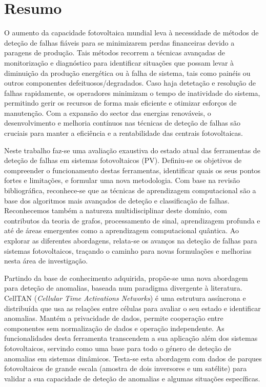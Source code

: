 \chapter*{Resumo}

O aumento da capacidade fotovoltaica mundial leva à necessidade de métodos de deteção de falhas fiáveis para se minimizarem perdas financeiras devido a paragens de produção. Tais métodos recorrem a técnicas avançadas de monitorização e diagnóstico para identificar situações que possam levar à diminuição da produção energética ou à falha de sistema, tais como painéis ou outros componentes defeituosos/degradados. Caso haja detetação e resolução de falhas rapidamente, os operadores minimizam o tempo de inatividade do sistema, permitindo gerir os recursos de forma mais eficiente e otimizar esforços de manutenção. Com a expansão do sector das energias renováveis, o desenvolvimento e melhoria contínuos nas técnicas de deteção de falhas são cruciais para manter a eficiência e a rentabilidade das centrais fotovoltaicas.

Neste trabalho faz-se uma avaliação exaustiva do estado atual das ferramentas de deteção de falhas em sistemas fotovoltaicos (PV). Definiu-se os objetivos de compreender o funcionamento destas ferramentas, identificar quais os seus pontos fortes e limitações, e formular uma nova metodologia. Com base na revisão bibliográfica, reconhece-se que as técnicas de aprendizagem computacional são a base dos algoritmos mais avançados de deteção e classificação de falhas. Reconhecemos também a natureza multidisciplinar deste domínio, com contributos da teoria de grafos, processamento de sinal, aprendizagem profunda e até de áreas emergentes como a aprendizagem computacional quântica. Ao explorar as diferentes abordagens, relata-se os avanços na deteção de falhas para sistemas fotovoltaicos, traçando o caminho para novas formulações e melhorias nesta área de investigação.

Partindo da base de conhecimento adquirida, propõe-se uma nova abordagem para deteção de anomalias, baseada num paradigma divergente à literatura. CellTAN (\textit{Cellular Time Activations Networks}) é uma estrutura assíncrona e distribuída que usa as relações entre células para avaliar o seu estado e identificar anomalias. Mantém a privacidade de dados, permite cooperação entre componentes sem normalização de dados e operação independente. As funcionalidades desta ferramenta transcendem a sua aplicação além dos sistemas fotovoltaicos, servindo como uma base para todo o género de deteção de anomalias em sistemas dinâmicos.
Testa-se esta abordagem com dados de parques fotovoltaicos de grande escala (amostra de dois inversores e um satélite) para validar a sua capacidade de deteção de anomalias e algumas situações específicas.

